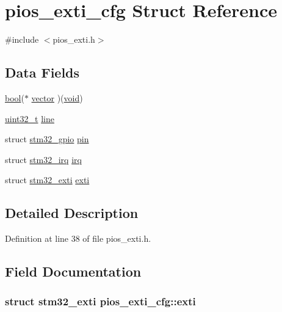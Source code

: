 \hypertarget{structpios__exti__cfg}{\section{pios\-\_\-exti\-\_\-cfg Struct Reference}
\label{structpios__exti__cfg}
}


{\ttfamily \#include $<$pios\-\_\-exti.\-h$>$}

\subsection*{Data Fields}
\begin{DoxyCompactItemize}
\item 
\hyperlink{group___exported__types_gaf6a258d8f3ee5206d682d799316314b1}{bool}($\ast$ \hyperlink{structpios__exti__cfg_a7fb58b83fd0a79e8aa956a683317723c}{vector} )(\hyperlink{group___n_a_m_e_ga18028b8badbf1ea7e704ccac3c488e82}{void})
\item 
\hyperlink{stdint_8h_a435d1572bf3f880d55459d9805097f62}{uint32\-\_\-t} \hyperlink{structpios__exti__cfg_ac8acb6d5a45610f65ed2eb066216694b}{line}
\item 
struct \hyperlink{structstm32__gpio}{stm32\-\_\-gpio} \hyperlink{structpios__exti__cfg_a099174bef966c8ee8091cb1d00343a4b}{pin}
\item 
struct \hyperlink{structstm32__irq}{stm32\-\_\-irq} \hyperlink{structpios__exti__cfg_a581dede4e7459e6a9586711e62c3fcc7}{irq}
\item 
struct \hyperlink{structstm32__exti}{stm32\-\_\-exti} \hyperlink{structpios__exti__cfg_a2e23a11b2a84a08143b9e5ac6a3fe36b}{exti}
\end{DoxyCompactItemize}


\subsection{Detailed Description}


Definition at line 38 of file pios\-\_\-exti.\-h.



\subsection{Field Documentation}
\hypertarget{structpios__exti__cfg_a2e23a11b2a84a08143b9e5ac6a3fe36b}{
\subsubsection[{exti}]{\setlength{\rightskip}{0pt plus 5cm}struct {\bf stm32\-\_\-exti} pios\-\_\-exti\-\_\-cfg\-::exti}}\label{structpios__exti__cfg_a2e23a11b2a84a08143b9e5ac6a3fe36b}


